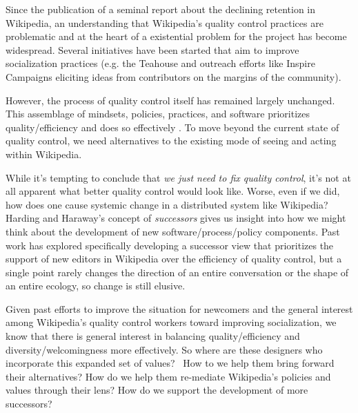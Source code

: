 Since the publication of a seminal report about the declining retention in Wikipedia, an understanding that Wikipedia's quality control practices are problematic and at the heart of a existential problem for the project has become widespread.  Several initiatives have been started that aim to improve socialization practices (e.g. the Teahouse and outreach efforts like Inspire Campaigns\cite{morgan2015what} eliciting ideas from contributors on the margins of the community).

However, the process of quality control itself has remained largely unchanged.  This assemblage of mindsets, policies, practices, and software prioritizes quality/efficiency and does so effectively \cite{geiger2013levee}\cite{halfaker2014snuggle}.  To move beyond the current state of quality control, we need alternatives to the existing mode of seeing and acting within Wikipedia.

While it's tempting to conclude that \emph{we just need to fix quality control}, it's not at all apparent what better quality control would look like.  Worse, even if we did, how does one cause systemic change in a distributed system like Wikipedia?  Harding and Haraway's concept of \emph{successors}\cite{haraway1988situated}\cite{harding1987feminism} gives us insight into how we might think about the development of new software/process/policy components.  Past work has explored specifically developing a successor view that prioritizes the support of new editors in Wikipedia over the efficiency of quality control\cite{halfaker2014snuggle}\cite{geiger2014successor}, but a single point rarely changes the direction of an entire conversation or the shape of an entire ecology, so change is still elusive.

Given past efforts to improve the situation for newcomers\cite{morgan2013tea} and the general interest among Wikipedia's quality control workers toward improving socialization\cite{halfaker2014snuggle}, we know that there is general interest in balancing quality/efficiency and diversity/welcomingness more effectively.  So where are these designers who incorporate this expanded set of values?  How to we help them bring forward their alternatives?  How do we help them re-mediate Wikipedia's policies and values through their lens?  How do we support the development of more successors?

